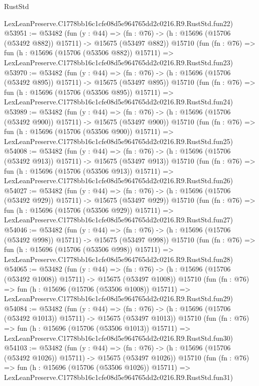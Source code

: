 \begin{lexlean}{RustStd}
\begin{coremodule}
    LexLeanPreserve.C1778bb16c1cfe08d5e964765dd2c0216.R9.RustStd.fun22)
@53951 := @53482
    (fun (y : @44) =>
    (fn : @76) -> (h : @15696 (@15706 (@53492 @882)) @15711) -> @15675 (@53497 @882))
    @15710
    (fun (fn : @76) =>
    fun (h : @15696 (@15706 (@53506 @882)) @15711) =>
    LexLeanPreserve.C1778bb16c1cfe08d5e964765dd2c0216.R9.RustStd.fun23)
@53970 := @53482
    (fun (y : @44) =>
    (fn : @76) -> (h : @15696 (@15706 (@53492 @895)) @15711) -> @15675 (@53497 @895))
    @15710
    (fun (fn : @76) =>
    fun (h : @15696 (@15706 (@53506 @895)) @15711) =>
    LexLeanPreserve.C1778bb16c1cfe08d5e964765dd2c0216.R9.RustStd.fun24)
@53989 := @53482
    (fun (y : @44) =>
    (fn : @76) -> (h : @15696 (@15706 (@53492 @900)) @15711) -> @15675 (@53497 @900))
    @15710
    (fun (fn : @76) =>
    fun (h : @15696 (@15706 (@53506 @900)) @15711) =>
    LexLeanPreserve.C1778bb16c1cfe08d5e964765dd2c0216.R9.RustStd.fun25)
@54008 := @53482
    (fun (y : @44) =>
    (fn : @76) -> (h : @15696 (@15706 (@53492 @913)) @15711) -> @15675 (@53497 @913))
    @15710
    (fun (fn : @76) =>
    fun (h : @15696 (@15706 (@53506 @913)) @15711) =>
    LexLeanPreserve.C1778bb16c1cfe08d5e964765dd2c0216.R9.RustStd.fun26)
@54027 := @53482
    (fun (y : @44) =>
    (fn : @76) -> (h : @15696 (@15706 (@53492 @929)) @15711) -> @15675 (@53497 @929))
    @15710
    (fun (fn : @76) =>
    fun (h : @15696 (@15706 (@53506 @929)) @15711) =>
    LexLeanPreserve.C1778bb16c1cfe08d5e964765dd2c0216.R9.RustStd.fun27)
@54046 := @53482
    (fun (y : @44) =>
    (fn : @76) -> (h : @15696 (@15706 (@53492 @998)) @15711) -> @15675 (@53497 @998))
    @15710
    (fun (fn : @76) =>
    fun (h : @15696 (@15706 (@53506 @998)) @15711) =>
    LexLeanPreserve.C1778bb16c1cfe08d5e964765dd2c0216.R9.RustStd.fun28)
@54065 := @53482
    (fun (y : @44) =>
    (fn : @76) -> (h : @15696 (@15706 (@53492 @1008)) @15711) -> @15675 (@53497 @1008))
    @15710
    (fun (fn : @76) =>
    fun (h : @15696 (@15706 (@53506 @1008)) @15711) =>
    LexLeanPreserve.C1778bb16c1cfe08d5e964765dd2c0216.R9.RustStd.fun29)
@54084 := @53482
    (fun (y : @44) =>
    (fn : @76) -> (h : @15696 (@15706 (@53492 @1013)) @15711) -> @15675 (@53497 @1013))
    @15710
    (fun (fn : @76) =>
    fun (h : @15696 (@15706 (@53506 @1013)) @15711) =>
    LexLeanPreserve.C1778bb16c1cfe08d5e964765dd2c0216.R9.RustStd.fun30)
@54103 := @53482
    (fun (y : @44) =>
    (fn : @76) -> (h : @15696 (@15706 (@53492 @1026)) @15711) -> @15675 (@53497 @1026))
    @15710
    (fun (fn : @76) =>
    fun (h : @15696 (@15706 (@53506 @1026)) @15711) =>
    LexLeanPreserve.C1778bb16c1cfe08d5e964765dd2c0216.R9.RustStd.fun31)

\end{coremodule}
\end{lexlean}
